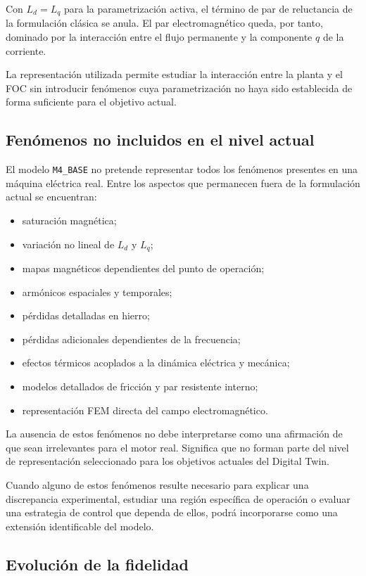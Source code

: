 Con $L_d=L_q$ para la parametrización activa, el término de par de reluctancia de la formulación clásica se anula. El par electromagnético queda, por tanto, dominado por la interacción entre el flujo permanente y la componente $q$ de la corriente.

La representación utilizada permite estudiar la interacción entre la planta y el FOC sin introducir fenómenos cuya parametrización no haya sido establecida de forma suficiente para el objetivo actual.

\subsection{Fenómenos no incluidos en el nivel actual}

El modelo \texttt{M4\_BASE} no pretende representar todos los fenómenos presentes en una máquina eléctrica real. Entre los aspectos que permanecen fuera de la formulación actual se encuentran:

\begin{itemize}
\item saturación magnética;
\item variación no lineal de $L_d$ y $L_q$;
\item mapas magnéticos dependientes del punto de operación;
\item armónicos espaciales y temporales;
\item pérdidas detalladas en hierro;
\item pérdidas adicionales dependientes de la frecuencia;
\item efectos térmicos acoplados a la dinámica eléctrica y mecánica;
\item modelos detallados de fricción y par resistente interno;
\item representación FEM directa del campo electromagnético.
\end{itemize}

La ausencia de estos fenómenos no debe interpretarse como una afirmación de que sean irrelevantes para el motor real. Significa que no forman parte del nivel de representación seleccionado para los objetivos actuales del Digital Twin.

Cuando alguno de estos fenómenos resulte necesario para explicar una discrepancia experimental, estudiar una región específica de operación o evaluar una estrategia de control que dependa de ellos, podrá incorporarse como una extensión identificable del modelo.

\subsection{Evolución de la fidelidad}

